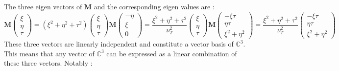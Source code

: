 The three eigen vectors of $\mathbf{M}$ and the corresponding eigen values are :
\begin{subequations}
\begin{equation}
    \mathbf{M}\begin{pmatrix}
    \xi \\ \eta \\ \tau 
    \end{pmatrix}
    =(\xi^2+\eta^2+\tau^2)\begin{pmatrix}
    \xi \\ \eta \\ \tau 
    \end{pmatrix}
\end{equation}
\begin{equation}
   \mathbf{M}\begin{pmatrix}
    -\eta \\ \xi \\ 0
    \end{pmatrix}
    =\frac{\xi^2+\eta^2+\tau^2}{\nu_T^2}\begin{pmatrix}
    \xi \\ \eta \\ \tau 
    \end{pmatrix} 
\end{equation}
\begin{equation}
   \mathbf{M}\begin{pmatrix}
    -\xi\tau \\ \eta\tau \\ \xi^2+\eta^2
    \end{pmatrix}
    =\frac{\xi^2+\eta^2+\tau^2}{\nu_T^2}\begin{pmatrix}
    -\xi\tau \\ \eta\tau \\ \xi^2+\eta^2
    \end{pmatrix} 
\end{equation}
\end{subequations}
These three vectors are linearly independent and constitute a vector basis of $\mathbb{C}^3$. This means that any vector of $\mathbb{C}^3$ can be expressed as a linear combination of these three vectors. Notably :
